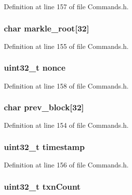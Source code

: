 Definition at line 157 of file Commands.h.

\hypertarget{struct_cmdblock_a6a88b5c7b1ef72e9ba761f9f8d4525a4}{
\subsubsection[{markle\_\-root}]{\setlength{\rightskip}{0pt plus 5cm}char {\bf markle\_\-root}\mbox{[}32\mbox{]}}}
\label{struct_cmdblock_a6a88b5c7b1ef72e9ba761f9f8d4525a4}


Definition at line 155 of file Commands.h.

\hypertarget{struct_cmdblock_aa2f9785a9d9116cc4592db06375cb887}{
\subsubsection[{nonce}]{\setlength{\rightskip}{0pt plus 5cm}uint32\_\-t {\bf nonce}}}
\label{struct_cmdblock_aa2f9785a9d9116cc4592db06375cb887}


Definition at line 158 of file Commands.h.

\hypertarget{struct_cmdblock_a742f80039bbe773ec691c1ce0ae01f95}{
\subsubsection[{prev\_\-block}]{\setlength{\rightskip}{0pt plus 5cm}char {\bf prev\_\-block}\mbox{[}32\mbox{]}}}
\label{struct_cmdblock_a742f80039bbe773ec691c1ce0ae01f95}


Definition at line 154 of file Commands.h.

\hypertarget{struct_cmdblock_ab20b0c7772544cf5d318507f34231fbe}{
\subsubsection[{timestamp}]{\setlength{\rightskip}{0pt plus 5cm}uint32\_\-t {\bf timestamp}}}
\label{struct_cmdblock_ab20b0c7772544cf5d318507f34231fbe}


Definition at line 156 of file Commands.h.

\hypertarget{struct_cmdblock_abdb4932647cd3ed8e9c289c37834b136}{
\subsubsection[{txnCount}]{\setlength{\rightskip}{0pt plus 5cm}uint32\_\-t {\bf txnCount}}}
\label{struct_cmdblock_abdb4932647cd3ed8e9c289c37834b136}


